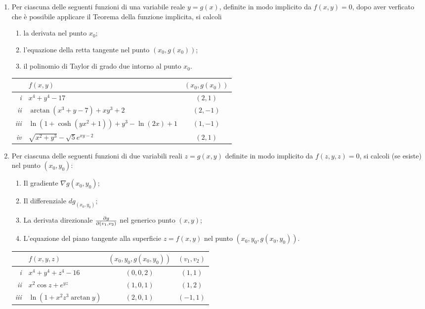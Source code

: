 \begin{enumerate}
\item Per ciascuna delle seguenti funzioni di una variabile reale 
$y=g(x)$, definite in modo implicito da $f(x,y)=0$, dopo aver verficato 
che \`e possibile applicare il Teorema della funzione implicita, si calcoli 
\begin{enumerate}
\item la derivata nel punto $x_0$;
\item l'equazione della retta tangente nel punto $(x_0,g(x_0))$;
\item il polinomio di Taylor di grado due intorno al punto $x_0$.
\end{enumerate}
\begin{center}
\begin{tabular}{|r||l|c|}
\hline
 & $f(x,y)$ & $(x_0,g(x_0))$ \\
\hline
\hline
{\it i} &$x^4+y^4-17$ & $(2,1)$ \\
\hline
{\it ii} &$\arctan(x^3+y-7)+xy^3+2$ & $(2,-1)$ \\
\hline
{\it iii} &$\ln(1+\cosh(yx^2+1))+y^3-\ln(2x)+1$ & $(1,-1)$ \\
\hline
{\it iv} &$\sqrt{x^2+y^3}-\sqrt{5}e^{xy-2} $ & $(2,1)$ \\
\hline
\end{tabular}
\end{center}
\item Per ciascuna delle seguenti funzioni di due variabili reali $z=g(x,y)$
definite in modo implicito da $f(z,y,z)=0$, si calcoli (se esiste) nel punto $(x_0,y_0)$:
\begin{enumerate}
\item Il gradiente $\nabla g(x_0,y_0)$;
\item Il differenziale $dg_{(x_0,y_0)}$;
\item La derivata direzionale ${\partial g\over \partial (v_1,v_2)}$ nel 
generico punto $(x,y)$;
\item L'equazione del piano tangente alla superficie $z=f(x,y)$ nel punto 
$(x_0,y_0,g(x_0,y_0))$.
\end{enumerate}
\begin{center}
\begin{tabular}{|r||l|c|c|}
\hline
 & $f(x,y,z)$ & $(x_0,y_0,g(x_0,y_0))$ & $(v_1,v_2)$\\
\hline
\hline
{\it i} &$x^4+y^4+z^4-16$ & $(0,0,2)$ & $(1,1)$\\
\hline
{\it ii} &$x^2\cos z+e^{yz}$ & $(1,0,1)$ & $(1,2)$\\
\hline
{\it iii} &$\ln(1+x^2z^3\arctan y)$ & $(2,0,1)$ & $(-1,1)$\\

\end{tabular}
\end{center}
\end{enumerate}
